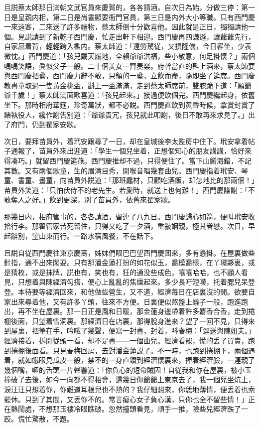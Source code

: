 且説蔡太師那日滿朝文武官員來慶賀的，各各請酒。自次日為始，分做三停：第一日是皇親内相，第二日是尚書顯要衙門官員，第三日是内外大小等職。只有西門慶一來遠客，二來送了許多禮物，蔡太師倒十分歡喜他。因此就是正日，獨獨請他一個。見説請到了新乾子西門慶，忙走出軒下相迎。西門慶再四謙遜，讓爺爺先行，自家屈着背，輕輕跨入檻内。蔡太師道：「遠勞駕従，又損隆儀，今日畧坐，少表微忱。」西門慶道：「孩兒戴天履地，全賴爺爺洪福，些小敬意，何足掛懷？」兩個喁喁笑語，眞似父子一般。二十個羙女一齊奏楽。府幹當直的斟上酒來，蔡太師要與西門慶把盞，西門慶力辭不敢，只領的一盞，立飲而盡，隨即坐了筵席。西門慶教書童取過一隻黃金桃盃，斟上一盃滿滿，走到蔡太師席前，雙膝跪下道：「願爺爺千歲！」蔡太師滿面歡喜道：「孩兒起來。」接過便飲個完。西門慶纔起身，依舊坐下。那時相府華筵，珍奇萬狀，都不必説。西門慶直飲到黄昏時候，拿賞封賞了諸執役人，纔作謝告別道：「爺爺貴冗，孩兒就此叩謝，後日不敢再來求見了。」出了府門，仍到翟家安歇。

次日，要拜苗員外，着玳安跟尋了一日，却在皇城後李太監房中住下。玳安拿着帖子通報了，苗員外來出迎道：「學生一個兒坐着，正想個知心的朋友講講，恰好來得凑巧。」就留西門慶筵燕。西門慶推却不過，只得便住了。當下山餚海錯，不記其數。又有兩個歌童，生的眉清目秀，開喉音唱幾套曲兒。西門慶指着玳安、琴童、書童、畫童，向苗員外説道：「那班蠢材，只顧吃酒飯，却怎地比的那兩個！」苗員外笑道：「只怕伏侍不的老先生。若愛時，就送上也何難！」西門慶謙謝：「不敢奪人之好。」飲到更深，別了苗員外，依舊來翟家歇。

那幾日内，相府管事的，各各請酒，留連了八九日。西門慶歸心如箭，便叫玳安收拾行李。那翟管家苦死留住，只得又吃了一夕酒，重敍姻親，極其眷戀。次日，早起辭別，望山東而行。一路水宿風餐，不在話下。

且説自従西門慶往東京慶壽，姊妹們眼巴巴望西門慶囬來，多有懸掛。在屋裏做些針指，通不出來閑耍。只有那潘金蓮打扮的如花似玉，喬模喬樣，在丫環夥裏，或是猜枚，或是抹牌，説也有，笑也有，狂的通没些成色，嘻嘻哈哈，也不顧人看見，只想着與陳經濟勾搭，便心上亂亂的焦燥起來。多少長吁短嘆，托着腮兒呆登登。本待要等經濟回來，和他做些營生，又不道，經濟每日在店裏沒的閒。欲要自家出來尋着他，又有許多丫頭，往來不方便。日裏便似熬盤上蟻子一般，跑進跑出，再不坐在屋裏。那一日正是風和日暖，那金蓮身邊帶着許多麝香合香，走到捲棚後面，只望着雪洞裏。那經濟日在店裏，那得脫身進來？望了一回不見，只得來到屋裏，把筆在手，吟哦了幾聲，便寫一封書，封着，呌春梅：「逕送與陳姐夫。」經濟接着，拆開従頭一看，却不是書——一個曲兒。經濟看罷，慌的丢了買賣，跑到捲棚後面看。只見春梅回房，去對潘金蓮説了。不一時，也跑到捲棚下，兩個遇着，就如餓眼見瓜皮一般，禁不的一身直鑽到經濟懷裏來，捧着經濟臉，一連親了幾個嘴，咂的舌頭一片聲響道：「你負心的短命賊囚！自従我和你在屋裏，被小玉撞破了去後，如今一向都不得相會，這幾日你爺爺上東京去了，我一個兒坐炕上，淚汪汪只想着你，你難道耳根兒也不熱的？我仔細想來，你恁地薄情，便丢着也索罷休。只到了其間，又丢你不的。常言癡心女子負心漢，只你也全不留些情！」正在熱鬧處，不想那玉樓冷眼瞧破。忽然擡頭看見，順手一推，險些兒經濟跌了一跤。慌忙驚散，不題。

